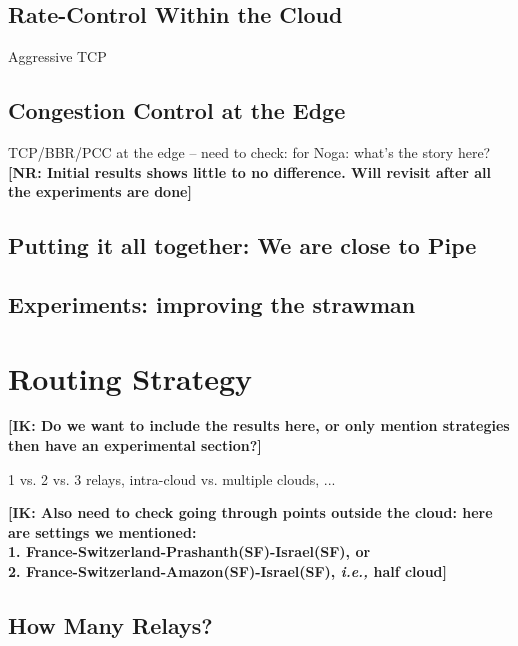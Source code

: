 \documentclass[10pt,sigconf]{acmart}
\newcommand{\mycomm}[3]{{\color{#2} \textbf{[#1: #3]}}}
\newcommand{\mycomm}[3]{}
\newcommand{\IK}[1]{\mycomm{IK}{blue}{#1}}
\newcommand{\NR}[1]{\mycomm{NR}{violet}{#1}}
\providecommand{\ie}{\emph{i.e.,} }
\begin{document}


\subsection{Rate-Control Within the Cloud}
Aggressive TCP

\subsection{Congestion Control at the Edge}

TCP/BBR/PCC at the edge -- need to check: for Noga: what's the story here? \NR{Initial results shows little to no difference. Will revisit after all the experiments are done}

\subsection{Putting it all together: We are close to Pipe}

\subsection{Experiments: improving the strawman}

\section{Routing Strategy}

\IK{Do we want to include the results here, or only mention strategies then have an experimental section?}

1 vs. 2 vs. 3 relays, intra-cloud vs. multiple clouds, ...


\IK{Also need to check going through points outside the cloud: here are settings we mentioned:\\
1. France-Switzerland-Prashanth(SF)-Israel(SF), or\\
2. France-Switzerland-Amazon(SF)-Israel(SF), \ie half cloud}


\subsection{How Many Relays?} \label{sec:numb_of_relays}
\end{document}
